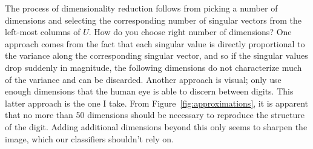 \documentclass{article}
\begin{document}
The process of dimensionality reduction follows from picking a number of dimensions and selecting the corresponding number of singular vectors from the left-most columns of $U$. How do you choose right number of dimensions? One approach comes from the fact that each singular value is directly proportional to the variance along the corresponding singular vector, and so if the singular values drop suddenly in magnitude, the following dimensions do not characterize much of the variance and can be discarded. Another approach is visual; only use enough dimensions that the human eye is able to discern between digits. This latter approach is the one I take. From Figure~\ref{fig:approximations}, it is apparent that no more than 50 dimensions should be necessary to reproduce the structure of the digit. Adding additional dimensions beyond this only seems to sharpen the image, which our classifiers shouldn't rely on.
\end{document}

